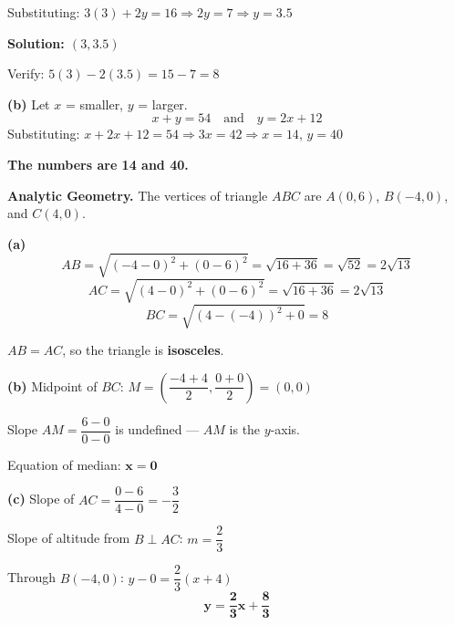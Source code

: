 \documentclass[addpoints]{exam}
\begin{document}
\begin{questions}
\begin{solution}[10cm]
Substituting: $3(3) + 2y = 16 \Rightarrow 2y = 7 \Rightarrow y = 3.5$

\textbf{Solution: $(3, 3.5)$}

Verify: $5(3) - 2(3.5) = 15 - 7 = 8$ \checkmark

\textbf{(b)} Let $x$ = smaller, $y$ = larger.
\[x + y = 54 \quad \text{and} \quad y = 2x + 12\]
Substituting: $x + 2x + 12 = 54 \Rightarrow 3x = 42 \Rightarrow x = 14$, $y = 40$

\textbf{The numbers are 14 and 40.}
\end{solution}

\question[8] \textbf{Analytic Geometry.} The vertices of triangle $ABC$ are $A(0, 6)$, $B(-4, 0)$, and $C(4, 0)$.
\begin{solution}[10cm]
\textbf{(a)}
\[AB = \sqrt{(-4-0)^2+(0-6)^2} = \sqrt{16+36} = \sqrt{52} = 2\sqrt{13}\]
\[AC = \sqrt{(4-0)^2+(0-6)^2} = \sqrt{16+36} = 2\sqrt{13}\]
\[BC = \sqrt{(4-(-4))^2+0} = 8\]

$AB = AC$, so the triangle is \textbf{isosceles}.

\textbf{(b)} Midpoint of $BC$: $M = \left(\dfrac{-4+4}{2}, \dfrac{0+0}{2}\right) = (0, 0)$

Slope $AM = \dfrac{6-0}{0-0}$ is undefined — $AM$ is the $y$-axis.

Equation of median: $\mathbf{x = 0}$

\textbf{(c)} Slope of $AC = \dfrac{0-6}{4-0} = -\dfrac{3}{2}$

Slope of altitude from $B \perp AC$: $m = \dfrac{2}{3}$

Through $B(-4, 0)$: $y - 0 = \dfrac{2}{3}(x + 4)$
\[\mathbf{y = \dfrac{2}{3}x + \dfrac{8}{3}}\]
\end{solution}


\end{questions}
\end{document}
